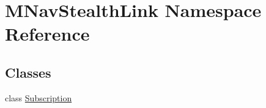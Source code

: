 \hypertarget{namespace_m_nav_stealth_link}{\section{M\-Nav\-Stealth\-Link Namespace Reference}
\label{namespace_m_nav_stealth_link}
}
\subsection*{Classes}
\begin{DoxyCompactItemize}
\item 
class \hyperlink{class_m_nav_stealth_link_1_1_subscription}{Subscription}
\end{DoxyCompactItemize}
